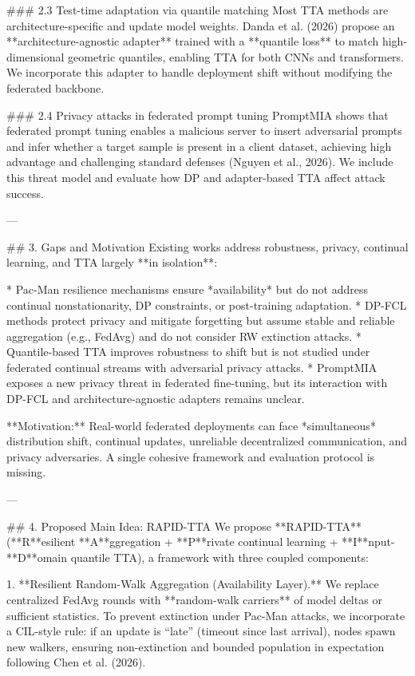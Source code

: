 ### 2.3 Test-time adaptation via quantile matching  
Most TTA methods are architecture-specific and update model weights. Danda et al. (2026) propose an **architecture-agnostic adapter** trained with a **quantile loss** to match high-dimensional geometric quantiles, enabling TTA for both CNNs and transformers. We incorporate this adapter to handle deployment shift without modifying the federated backbone.

### 2.4 Privacy attacks in federated prompt tuning  
PromptMIA shows that federated prompt tuning enables a malicious server to insert adversarial prompts and infer whether a target sample is present in a client dataset, achieving high advantage and challenging standard defenses (Nguyen et al., 2026). We include this threat model and evaluate how DP and adapter-based TTA affect attack success.

---

## 3. Gaps and Motivation  
Existing works address robustness, privacy, continual learning, and TTA largely **in isolation**:

* Pac-Man resilience mechanisms ensure *availability* but do not address continual nonstationarity, DP constraints, or post-training adaptation.  
* DP-FCL methods protect privacy and mitigate forgetting but assume stable and reliable aggregation (e.g., FedAvg) and do not consider RW extinction attacks.  
* Quantile-based TTA improves robustness to shift but is not studied under federated continual streams with adversarial privacy attacks.  
* PromptMIA exposes a new privacy threat in federated fine-tuning, but its interaction with DP-FCL and architecture-agnostic adapters remains unclear.

**Motivation:** Real-world federated deployments can face *simultaneous* distribution shift, continual updates, unreliable decentralized communication, and privacy adversaries. A single cohesive framework and evaluation protocol is missing.

---

## 4. Proposed Main Idea: RAPID-TTA  
We propose **RAPID-TTA** (**R**esilient **A**ggregation + **P**rivate continual learning + **I**nput-**D**omain quantile TTA), a framework with three coupled components:

1. **Resilient Random-Walk Aggregation (Availability Layer).**  
   We replace centralized FedAvg rounds with **random-walk carriers** of model deltas or sufficient statistics. To prevent extinction under Pac-Man attacks, we incorporate a CIL-style rule: if an update is “late” (timeout since last arrival), nodes spawn new walkers, ensuring non-extinction and bounded population in expectation following Chen et al. (2026).


